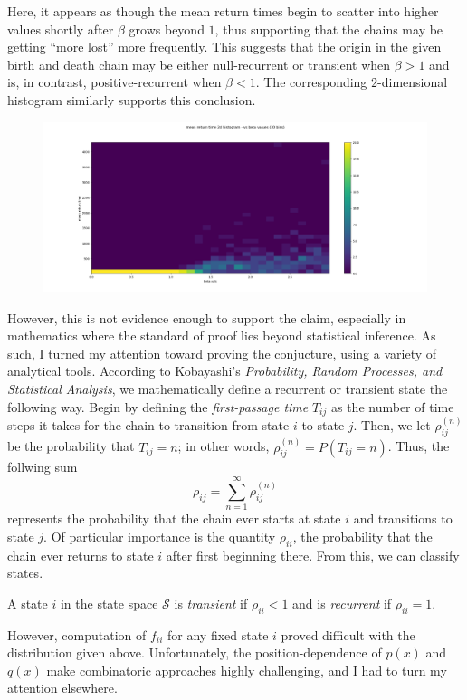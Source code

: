 Here, it appears as though the mean return times begin to scatter into higher values shortly after
$\beta$ grows beyond $1$, thus supporting that the chains may be getting ``more lost'' more frequently.
This suggests that the origin in the given birth and death chain may be either null-recurrent or
transient when $\beta > 1$ and is, in contrast, positive-recurrent when $\beta < 1$. The corresponding
$2$-dimensional histogram similarly supports this conclusion.

\noindent
\begin{figure}[H]
    \begin{center}
        \includegraphics[width=\textwidth]{plots/returntimesplot2.png}
    \end{center}
\end{figure}

However, this is not evidence enough to support the claim, especially in mathematics where the standard
of proof lies beyond statistical inference. As such, I turned my attention toward proving the
conjucture, using a variety of analytical tools. According to Kobayashi's \emph{Probability, Random
Processes, and Statistical Analysis}, we mathematically define a recurrent or transient state the
following way. Begin by defining the \emph{first-passage time} $T_{ij}$ as the number of time steps it
takes for the chain to transition from state $i$ to state $j$. Then, we let $\rho_{ij}^{(n)}$ be the
probability that $T_{ij} = n$; in other words, $\rho_{ij}^{(n)} = P(T_{ij} = n)$. Thus, the follwing sum
\[
    \rho_{ij} = \sum_{n=1}^{\infty} \rho_{ij}^{(n)}  
\]
represents the probability that the chain ever starts at state $i$ and transitions to state $j$. Of
particular importance is the quantity $\rho_{ii}$, the probability that the chain ever returns to state
$i$ after first beginning there. From this, we can classify states.
\begin{definition}
    A state $i$ in the state space $\mathcal{S}$ is \emph{transient} if $\rho_{ii} < 1$ and is
    \emph{recurrent} if $\rho_{ii} = 1$.
\end{definition}
However, computation of $f_{ii}$ for any fixed state $i$ proved difficult with the distribution given
above.  Unfortunately, the position-dependence of $p(x)$ and $q(x)$ make combinatoric approaches highly
challenging, and I had to turn my attention elsewhere.

